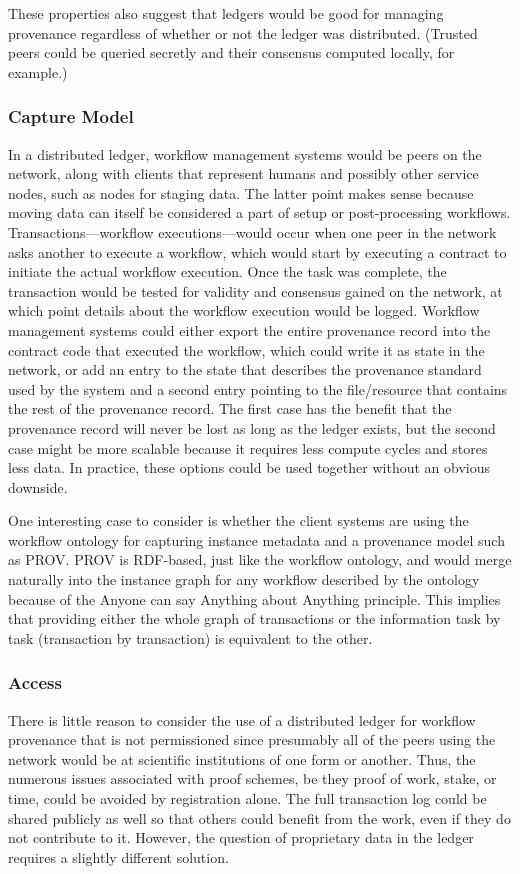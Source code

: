 These properties also suggest that ledgers would be good for managing provenance
regardless of whether or not the ledger was distributed. (Trusted peers could be
queried secretly and their consensus computed locally, for example.)

\subsubsection{Capture Model}
In a distributed ledger, workflow management systems would be peers on the
network, along with clients that represent humans and possibly other service
nodes, such as nodes for staging data. The latter point makes sense because
moving data can itself be considered a part of setup or post-processing
workflows. Transactions---workflow executions---would occur when one peer in the
network asks another to execute a workflow, which would start by executing a
contract to initiate the actual workflow execution. Once the task was complete,
the transaction would be tested for validity and consensus gained on the
network, at which point details about the workflow execution would be logged.
Workflow management systems could either export the entire provenance record
into the contract code that executed the workflow, which could write it as state
in the network, or add an entry to the state that describes the provenance
standard used by the system and a second entry pointing to the file/resource
that contains the rest of the provenance record. The first case has the benefit
that the provenance record will never be lost as long as the ledger exists, but
the second case might be more scalable because it requires less compute cycles
and stores less data. In practice, these options could be used together without
an obvious downside.

One interesting case to consider is whether the client systems are using the
workflow ontology for capturing instance metadata and a provenance model such
as PROV. PROV is RDF-based, just like the workflow ontology, and would merge
naturally into the instance graph for any workflow described by the ontology
because of the Anyone can say Anything about Anything principle. This implies
that providing either the whole graph of transactions or the information task by
task (transaction by transaction) is equivalent to the other.

\subsubsection{Access}
There is little reason to consider the use of a distributed ledger for workflow
provenance that is not permissioned since presumably all of the peers using the
network would be at scientific institutions of one form or another. Thus, the
numerous issues associated with proof schemes, be they proof of work, stake, or
time, could be avoided by registration alone. The full transaction log could be
shared publicly as well so that others could benefit from the work, even if they
do not contribute to it. However, the question of proprietary data in the ledger
requires a slightly different solution.

